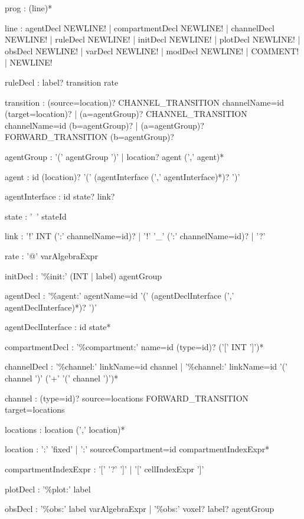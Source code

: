 \documentclass[english]{report}
\newcommand{\newbnf}[1]{\colorbox[rgb]{0.8,0.8,1}{#1}}
\begin{document}
\begin{bnfsource}
prog :
  (line)*

line :
  agentDecl NEWLINE!
  | \newbnf{compartmentDecl NEWLINE!}
  | \newbnf{channelDecl NEWLINE!}
  | ruleDecl NEWLINE!
  | initDecl NEWLINE!
  | plotDecl NEWLINE!
  | obsDecl NEWLINE!
  | varDecl NEWLINE!
  | modDecl NEWLINE!
  | COMMENT!
  | NEWLINE!

ruleDecl :
  label? transition rate 

transition :
  \newbnf{(source=location)? CHANNEL_TRANSITION channelName=id (target=location)?}
  | \newbnf{(a=agentGroup)? CHANNEL_TRANSITION channelName=id (b=agentGroup)?}
  | (a=agentGroup)? FORWARD_TRANSITION (b=agentGroup)?
  
agentGroup :
  '(' agentGroup ')'
  | \newbnf{location?} agent (',' agent)*

agent :
  id \newbnf{(location)?} '(' (agentInterface (',' agentInterface)*)? ')'

agentInterface :
  id state? link?

state :
  '~' stateId

link :
  '!' INT \newbnf{(':' channelName=id)?}
  | '!' '_' \newbnf{(':' channelName=id)?}
  | '?'

rate :
  '@' varAlgebraExpr

initDecl :
  '\%init:' (INT | label) agentGroup

agentDecl :
  '\%agent:' agentName=id '(' (agentDeclInterface (',' agentDeclInterface)*)? ')'

agentDeclInterface :
  id state*

\newbnf{compartmentDecl :}
  \newbnf{'\%compartment:' name=id (type=id)? ('[' INT ']')*}

\newbnf{channelDecl :}
  \newbnf{'\%channel:' linkName=id channel}
  \newbnf{| '\%channel:' linkName=id '(' channel ')' ('+' '(' channel ')')*}

\newbnf{channel :}
  \newbnf{(type=id)? source=locations FORWARD_TRANSITION target=locations}

\newbnf{locations :}
  \newbnf{location (',' location)*}

\newbnf{location :}
  \newbnf{':' 'fixed'}
  \newbnf{| ':' sourceCompartment=id compartmentIndexExpr*}

\newbnf{compartmentIndexExpr :}
  \newbnf{'[' '?' ']'}
  | \newbnf{'[' cellIndexExpr ']'}

plotDecl :
  '\%plot:' label

obsDecl :
  '\%obs:' label varAlgebraExpr
  | '\%obs:' \newbnf{voxel?} label? agentGroup


\end{bnfsource}
\end{document}
